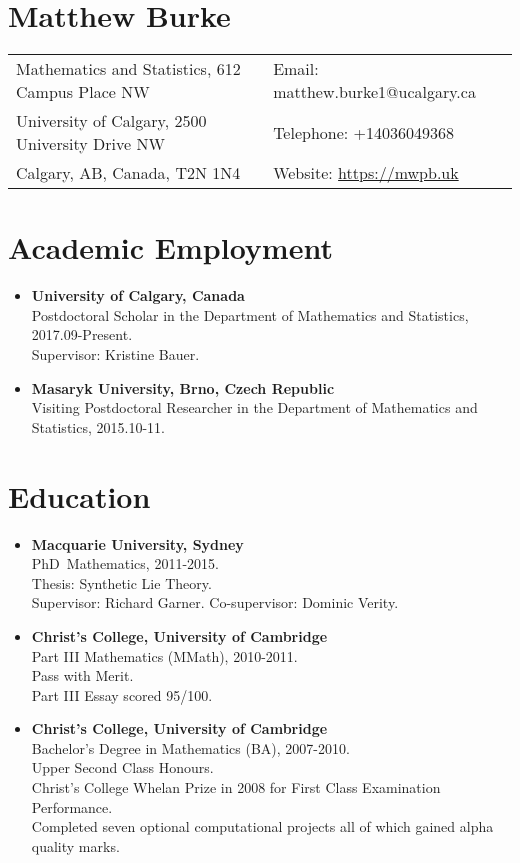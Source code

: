 \documentclass[10pt]{article}
\date{}
\begin{document}
\section*{\Huge Matthew Burke}
\begin{tabu}{@{}X[l6]X[r4]}
Mathematics and Statistics, 612 Campus Place NW & Email: matthew.burke1@ucalgary.ca \\
University of Calgary, 2500 University Drive NW & Telephone: +14036049368\\
Calgary, AB, Canada, T2N 1N4 & Website: \url{https://mwpb.uk}
\end{tabu}

\section*{Academic Employment}
\begin{itemize}
    \item {\bf University of Calgary, Canada}\\
    Postdoctoral Scholar in the Department of Mathematics and Statistics, 2017.09-Present.\\
        Supervisor: Kristine Bauer.
    \item {\bf Masaryk University, Brno, Czech Republic}\\
    Visiting Postdoctoral Researcher in the Department of Mathematics and Statistics, 2015.10-11.
\end{itemize}

\section*{Education}
\begin{itemize}
    \item {\bf Macquarie University, Sydney}\\
    PhD~Mathematics, 2011-2015.\\
    Thesis: Synthetic Lie Theory.\\
    Supervisor: Richard Garner. Co-supervisor: Dominic Verity.\\
    \item {\bf Christ's College, University of Cambridge}\\
    Part III Mathematics (MMath), 2010-2011.\\
    Pass with Merit.\\
    Part III Essay scored 95/100.\\
    \item {\bf Christ's College, University of Cambridge}\\
    Bachelor's Degree in Mathematics (BA), 2007-2010.\\
    Upper Second Class Honours.\\
    Christ's College Whelan Prize in 2008 for First Class Examination Performance.\\Completed seven optional computational projects all of which gained alpha quality marks.
\end{itemize}
\end{document}
